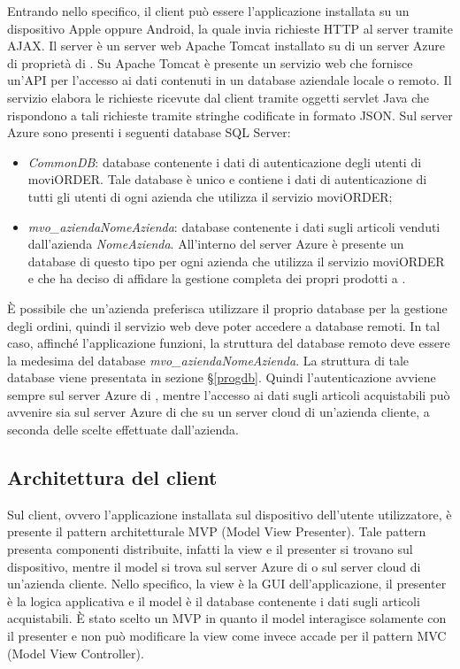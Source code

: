 Entrando nello specifico, il client può essere l'applicazione installata su un dispositivo Apple oppure Android, la quale invia richieste HTTP al server tramite AJAX. Il server è un server web Apache Tomcat installato su di un server Azure di proprietà di \visione{}. Su Apache Tomcat è presente un servizio web che fornisce un'API per l'accesso ai dati contenuti in un database aziendale locale o remoto. Il servizio elabora le richieste ricevute dal client tramite oggetti servlet Java che rispondono a tali richieste tramite stringhe codificate in formato JSON. Sul server Azure sono presenti i seguenti database SQL Server:
\begin{itemize}
	\item \textit{CommonDB}: database contenente i dati di autenticazione degli utenti di moviORDER. Tale database è unico e contiene i dati di autenticazione di tutti gli utenti di ogni azienda che utilizza il servizio moviORDER;
	\item \textit{mvo\_aziendaNomeAzienda}: database contenente i dati sugli articoli venduti dall'azienda \textit{NomeAzienda}. All'interno del server Azure è presente un database di questo tipo per ogni azienda che utilizza il servizio moviORDER e che ha deciso di affidare la gestione completa dei propri prodotti a \visione{}.
\end{itemize}
È possibile che un'azienda preferisca utilizzare il proprio database per la gestione degli ordini, quindi il servizio web deve poter accedere a database remoti. In tal caso, affinché l'applicazione funzioni, la struttura del database remoto deve essere la medesima del database \textit{mvo\_aziendaNomeAzienda}. La struttura di tale database viene presentata in sezione §\ref{progdb}.
Quindi l'autenticazione avviene sempre sul server Azure di \visione{}, mentre l'accesso ai dati sugli articoli acquistabili può avvenire sia sul server Azure di \visione{} che su un server cloud di un'azienda cliente, a seconda delle scelte effettuate dall'azienda.

\subsection{Architettura del client}

Sul client, ovvero l'applicazione installata sul dispositivo dell'utente utilizzatore, è presente il pattern architetturale MVP (Model View Presenter). Tale pattern presenta componenti distribuite, infatti la view e il presenter si trovano sul dispositivo, mentre il model si trova sul server Azure di \visione{} o sul server cloud di un'azienda cliente. Nello specifico, la view è la GUI dell'applicazione, il presenter è la logica applicativa e il model è il database contenente i dati sugli articoli acquistabili. È stato scelto un MVP in quanto il model interagisce solamente con il presenter e non può modificare la view come invece accade per il pattern MVC (Model View Controller).

